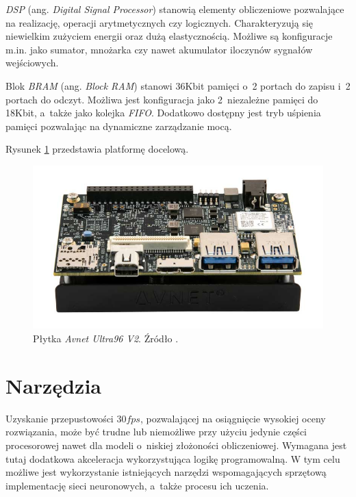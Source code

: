 \emph{DSP} (ang. \emph{Digital Signal Processor}) \cite{dsp} stanowią elementy obliczeniowe pozwalające na realizację, operacji arytmetycznych czy logicznych.
Charakteryzują się niewielkim zużyciem energii oraz dużą elastycznością.
Możliwe są konfiguracje m.in. jako sumator, mnożarka czy nawet akumulator iloczynów sygnałów wejściowych.

Blok \emph{BRAM} (ang. \emph{Block RAM}) \cite{bram} stanowi 36Kbit pamięci o~2 portach do zapisu i~2 portach do odczyt. 
Możliwa jest konfiguracja jako 2~niezależne pamięci do 18Kbit, a~także jako kolejka \emph{FIFO}.
Dodatkowo dostępny jest tryb uśpienia pamięci pozwalając na dynamiczne zarządzanie mocą. 

Rysunek \ref{fig:ultra96} przedstawia platformę docelową.

\begin{figure}
    \centering
    \includegraphics[width=\linewidth]{images/ultra96v2.png}
    \caption{Płytka \emph{Avnet Ultra96 V2}. Źródło \cite{avnet_ultra96}.}
    \label{fig:ultra96}
\end{figure}

\section{Narzędzia}
\label{ch:tools}
Uzyskanie przepustowości $30 fps$, pozwalającej na osiągnięcie wysokiej oceny rozwiązania, może być trudne lub niemożliwe  przy użyciu jedynie części procesorowej nawet dla modeli o~niskiej złożoności obliczeniowej. 
Wymagana jest tutaj dodatkowa akceleracja wykorzystująca logikę programowalną. 
W tym celu możliwe jest wykorzystanie istniejących narzędzi wspomagających sprzętową implementację sieci neuronowych, a~także procesu ich uczenia. 

